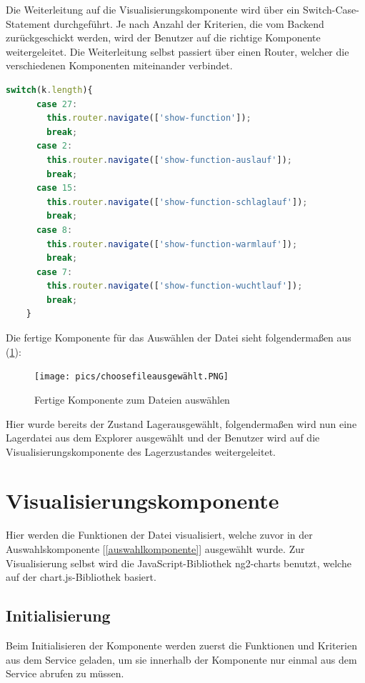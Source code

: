Die Weiterleitung auf die Visualisierungskomponente wird über ein Switch-Case-Statement durchgeführt. Je nach Anzahl der Kriterien, 
die vom Backend zurückgeschickt werden, wird der Benutzer auf die richtige Komponente weitergeleitet. Die Weiterleitung selbst
passiert über einen Router, welcher die verschiedenen Komponenten miteinander verbindet. 

\begin{lstlisting}[language=Typescript, caption={Switch-Case für die Weiterleitung zur Visualisierung}]
    switch(k.length){
      case 27:
        this.router.navigate(['show-function']);
        break;
      case 2:
        this.router.navigate(['show-function-auslauf']);
        break;
      case 15:
        this.router.navigate(['show-function-schlaglauf']);
        break;
      case 8:
        this.router.navigate(['show-function-warmlauf']);
        break;
      case 7:
        this.router.navigate(['show-function-wuchtlauf']);
        break;
    }
\end{lstlisting}

Die fertige Komponente für das Auswählen der Datei sieht folgendermaßen aus (\ref{fig:dateiauswählen}):

\begin{figure}[H]
    \centering
    \texttt{[image: pics/choosefileausgewählt.PNG]}
    \caption{Fertige Komponente zum Dateien auswählen}
    \label{fig:dateiauswählen}
\end{figure}

Hier wurde bereits der Zustand \dq Lager\dq  ausgewählt, folgendermaßen wird nun eine Lagerdatei aus dem Explorer ausgewählt und der 
Benutzer wird auf die Visualisierungskomponente des Lagerzustandes weitergeleitet.

\section{Visualisierungskomponente} \label{visualisation}
Hier werden die Funktionen der Datei visualisiert, welche zuvor in der Auswahlskomponente [\ref{auswahlkomponente}] ausgewählt wurde.
Zur Visualisierung selbst wird die JavaScript-Bibliothek ng2-charts benutzt, welche auf der chart.js-Bibliothek 
basiert. 

\subsection{Initialisierung}
Beim Initialisieren der Komponente werden zuerst die Funktionen und Kriterien aus dem Service geladen, um sie innerhalb der 
Komponente nur einmal aus dem Service abrufen zu müssen.

